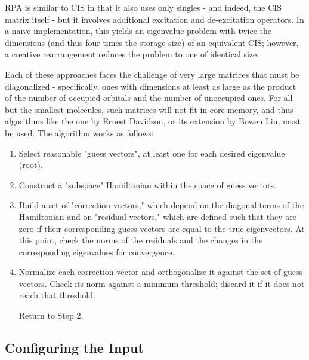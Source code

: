 \documentclass[12pt,letter,footinclude=true,headinclude=true,hyphens]{book} %
\begin{document}
    RPA is similar to CIS in that it also uses only singles - and indeed, the CIS matrix itself - but it involves additional excitation and de-excitation operators. In a na\"{\i}ve implementation, this yields an eigenvalue problem with twice the dimensions (and thus four times the storage size) of an equivalent CIS; however, a creative rearrangement reduces the problem to one of identical size.
    
    Each of these approaches faces the challenge of very large matrices that must be diagonalized - specifically, ones with dimensions at least as large as the product of the number of occupied orbitals and the number of unoccupied ones. For all but the smallest molecules, such matrices will not fit in core memory, and thus algorithms like the one by Ernest Davidson, or its extension by Bowen Liu, must be used. The algorithm works as follows:
    
    \begin{enumerate}
    \item Select reasonable "guess vectors", at least one for each desired eigenvalue (root).
    \item Construct a "subspace" Hamiltonian within the space of guess vectors.
    \item Build a set of "correction vectors," which depend on the diagonal terms of the Hamiltonian and on "residual vectors," which are defined such that they are zero if their corresponding guess vectors are equal to the true eigenvectors. At this point, check the norms of the residuals and the changes in the corresponding eigenvalues for convergence.
    \item Normalize each correction vector and orthogonalize it against the set of guess vectors. Check its norm against a minimum threshold; discard it if it does not reach that threshold.
    
    Return to Step 2.
    \end{enumerate}
    
    \subsection{Configuring the Input}
    \label{excited-state-input}
    
\end{document}
